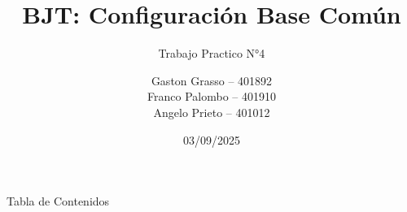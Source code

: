 \documentclass[]{beamer}
\title[BJT Base Común]{BJT: Configuración Base Común}
\subtitle{Trabajo Practico N°4}
\author[Grasso, Palombo, Prieto]{%
  \begin{tabular}{l}
      Gaston Grasso -- 401892 \\
    Franco Palombo -- 401910 \\
      Angelo Prieto -- 401012
  \end{tabular}
}
\institute[UTN - FRC]{Universidad Tecnológica Nacional, Facultad Regional Córdoba}
\date[2025]{03/09/2025}
\begin{document}
\frame{\titlepage}
\begin{frame}{Tabla de Contenidos}
\tableofcontents
\end{frame}





\end{document}
